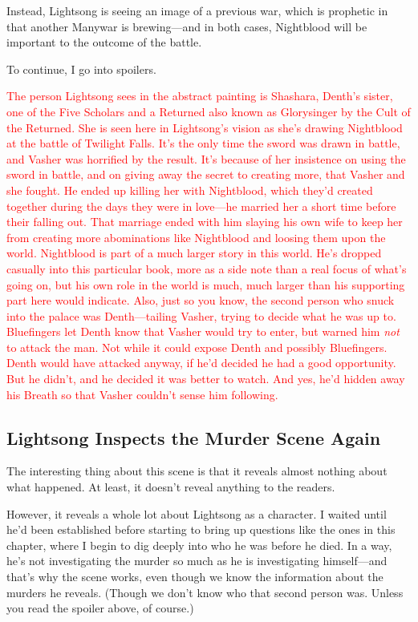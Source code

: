 Instead, Lightsong is seeing an image of a previous war, which is prophetic in that another Manywar is brewing—and in both cases, Nightblood will be important to the outcome of the battle.

To continue, I go into spoilers.

\textcolor{red}{
The person Lightsong sees in the abstract painting is Shashara, Denth’s sister, one of the Five Scholars and a Returned also known as Glorysinger by the Cult of the Returned. She is seen here in Lightsong’s vision as she’s drawing Nightblood at the battle of Twilight Falls. It’s the only time the sword was drawn in battle, and Vasher was horrified by the result.
}
\textcolor{red}{
It’s because of her insistence on using the sword in battle, and on giving away the secret to creating more, that Vasher and she fought. He ended up killing her with Nightblood, which they’d created together during the days they were in love—he married her a short time before their falling out. That marriage ended with him slaying his own wife to keep her from creating more abominations like Nightblood and loosing them upon the world.
}
\textcolor{red}{
Nightblood is part of a much larger story in this world. He’s dropped casually into this particular book, more as a side note than a real focus of what’s going on, but his own role in the world is much, much larger than his supporting part here would indicate.
}
\textcolor{red}{
Also, just so you know, the second person who snuck into the palace was Denth—tailing Vasher, trying to decide what he was up to. Bluefingers let Denth know that Vasher would try to enter, but warned him \textit{not} to attack the man. Not while it could expose Denth and possibly Bluefingers.
}
\textcolor{red}{
Denth would have attacked anyway, if he’d decided he had a good opportunity. But he didn’t, and he decided it was better to watch.
}
\textcolor{red}{
And yes, he’d hidden away his Breath so that Vasher couldn’t sense him following.
}

\subsection*{Lightsong Inspects the Murder Scene Again}

The interesting thing about this scene is that it reveals almost nothing about what happened. At least, it doesn’t reveal anything to the readers.

However, it reveals a whole lot about Lightsong as a character. I waited until he’d been established before starting to bring up questions like the ones in this chapter, where I begin to dig deeply into who he was before he died. In a way, he’s not investigating the murder so much as he is investigating himself—and that’s why the scene works, even though we know the information about the murders he reveals. (Though we don’t know who that second person was. Unless you read the spoiler above, of course.)



